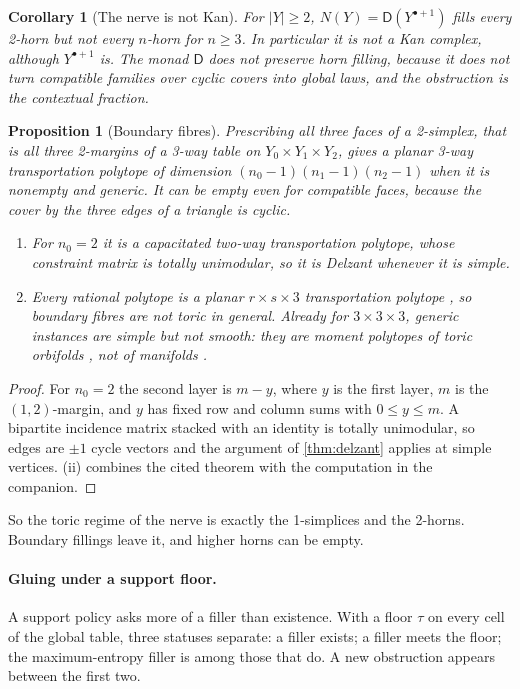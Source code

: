 \documentclass[11pt]{article}
\newtheorem{proposition}[theorem]{Proposition}
\newtheorem{corollary}[theorem]{Corollary}
\theoremstyle{definition}
\theoremstyle{remark}
\newcommand{\D}{\mathsf{D}}
\begin{document}
\begin{corollary}[The nerve is not Kan]\label{cor:notkan}
For $\lvert Y\rvert\ge2$, $N(Y)=\D(Y^{\bullet+1})$ fills every 2-horn but not every $n$-horn for $n\ge3$. In particular it is not
a Kan complex, although $Y^{\bullet+1}$ is. The monad $\D$ does not preserve horn filling, because it does not turn
compatible families over cyclic covers into global laws, and the obstruction is the contextual fraction.
\end{corollary}

\begin{proposition}[Boundary fibres]\label{prop:boundaryfibre}
Prescribing all three faces of a 2-simplex, that is all three 2-margins of a 3-way table on $Y_0\times Y_1\times Y_2$, gives
a planar 3-way transportation polytope of dimension $(n_0-1)(n_1-1)(n_2-1)$ when it is nonempty and generic. It can be empty
even for compatible faces, because the cover by the three edges of a triangle is cyclic.
\begin{enumerate}[label=(\roman*)]
\item For $n_0=2$ it is a capacitated two-way transportation polytope, whose constraint matrix is totally unimodular,
  so it is Delzant whenever it is simple.
\item Every rational polytope is a planar $r\times s\times3$ transportation polytope \cite{DeLoeraOnn2004}, so boundary fibres are
  not toric in general. Already for $3\times3\times3$, generic instances are simple but not smooth: they are moment polytopes
  of toric orbifolds \cite{LermanTolman1997}, not of manifolds \cite[\S10]{Awasthi-Family}.
\end{enumerate}
\end{proposition}
\begin{proof}
For $n_0=2$ the second layer is $m-y$, where $y$ is the first layer, $m$ is the $(1,2)$-margin, and $y$ has fixed row and column
sums with $0\le y\le m$. A bipartite incidence matrix stacked with an identity is totally unimodular, so edges are $\pm1$
cycle vectors and the argument of \cref{thm:delzant} applies at simple vertices. (ii) combines the cited theorem with
the computation in the companion.
\end{proof}

So the toric regime of the nerve is exactly the 1-simplices and the 2-horns. Boundary fillings leave it, and higher
horns can be empty.

\paragraph{Gluing under a support floor.} A support policy asks more of a filler than existence. With a floor $\tau$ on every cell
of the global table, three statuses separate: a filler exists; a filler meets the floor; the maximum-entropy filler is among those
that do. A new obstruction appears between the first two.
\end{document}
